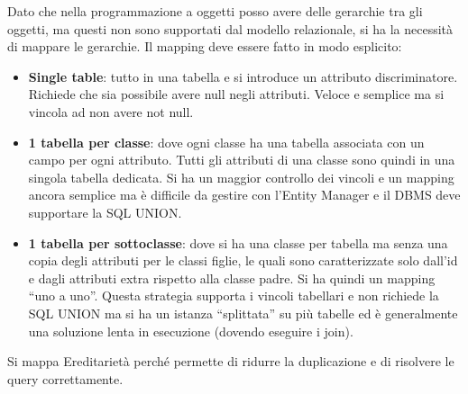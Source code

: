 Dato che nella programmazione a oggetti posso avere delle gerarchie tra gli oggetti,
ma questi non sono supportati dal modello relazionale, si ha la necessità di mappare
le gerarchie. Il mapping deve essere fatto in modo esplicito:
\begin{itemize}
      \item \textbf{Single table}: tutto in una tabella e si introduce un attributo
            discriminatore. Richiede che sia possibile avere null negli attributi.
            Veloce e semplice ma si vincola ad non avere not null.
      \item \textbf{1 tabella per classe}: dove ogni classe ha una tabella
            associata con un campo per ogni attributo. Tutti gli attributi di una
            classe sono quindi in una singola tabella dedicata. Si ha un maggior
            controllo dei vincoli e un mapping ancora semplice ma è difficile
            da gestire con l'Entity Manager e il DBMS deve supportare la SQL
            UNION.
      \item \textbf{1 tabella per sottoclasse}: dove si ha una classe per tabella
            ma senza una copia degli attributi per le classi figlie, le quali sono
            caratterizzate solo dall'id e dagli attributi extra rispetto alla
            classe padre. Si ha quindi un mapping “uno a uno”. Questa strategia
            supporta i vincoli tabellari e non richiede la SQL UNION ma si ha un
            istanza “splittata” su più tabelle ed è generalmente una soluzione
            lenta in esecuzione (dovendo eseguire i join).
\end{itemize}
Si mappa Ereditarietà perché permette di ridurre la duplicazione e di risolvere
le query correttamente.